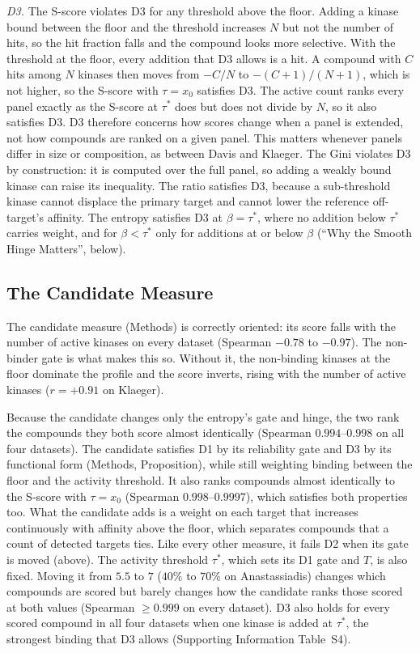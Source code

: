 \textit{D3.} The S-score violates D3 for any threshold above the floor. Adding
a kinase bound between the floor and the threshold increases $N$ but not the
number of hits, so the hit fraction falls and the compound looks more
selective. With the threshold at the floor, every addition that D3 allows is a
hit. A compound with $C$ hits among $N$ kinases then moves from $-C/N$ to
$-(C+1)/(N+1)$, which is not higher, so the S-score with $\tau = x_0$ satisfies
D3. The active count ranks every panel exactly as the S-score at $\tau^*$ does
but does not divide by $N$, so it also satisfies D3.
D3 therefore concerns how scores change when a panel is extended, not how
compounds are ranked on a given panel. This matters whenever panels differ in
size or composition, as between Davis and Klaeger. The Gini violates D3 by
construction: it is computed over the full panel, so adding a weakly bound
kinase can raise its inequality. The ratio satisfies D3, because a sub-threshold kinase cannot displace the
primary target and cannot lower the reference off-target's affinity. The
entropy satisfies D3 at $\beta = \tau^*$, where no addition below $\tau^*$
carries weight, and for $\beta < \tau^*$ only for additions at or below $\beta$
(``Why the Smooth Hinge Matters'', below).

\subsection{The Candidate Measure}
\label{sec:candidate}

The candidate measure (Methods) is correctly oriented: its score falls with
the number of active kinases on every dataset (Spearman $-0.78$ to $-0.97$).
The non-binder gate is what makes this so. Without it, the non-binding kinases
at the floor dominate the profile and the score inverts, rising with the number
of active kinases ($r = +0.91$ on Klaeger).

Because the candidate changes only the entropy's gate and hinge, the two rank the
compounds they both score almost identically (Spearman $0.994$--$0.998$ on all
four datasets). The candidate satisfies D1 by its reliability gate and D3 by
its functional form (Methods, Proposition), while still weighting binding
between the floor and the activity threshold. It also ranks compounds almost
identically to the S-score with $\tau = x_0$ (Spearman $0.998$--$0.9997$), which
satisfies both properties too. What the candidate adds is a weight on each
target that increases continuously with affinity above the floor, which
separates compounds that a count of detected targets ties. Like every other measure, it
fails D2 when its gate is moved (above). The activity threshold $\tau^*$, which
sets its D1 gate and $T$, is also fixed. Moving it from $5.5$ to $7$ ($40\%$ to
$70\%$ on Anastassiadis) changes which compounds are scored but barely changes
how the candidate ranks those scored at both values (Spearman $\geq 0.999$ on
every dataset). D3 also holds for every scored compound in all four datasets when one
kinase is added at $\tau^*$, the strongest binding that D3 allows (Supporting
Information Table~S4).

